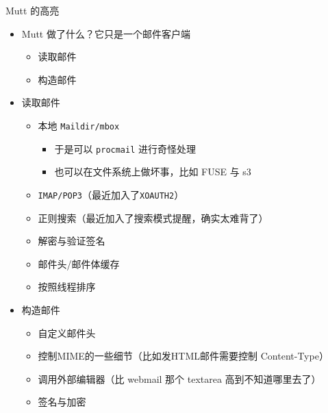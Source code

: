 \documentclass{ctexbeamer}
\newcommand{\T}[1]{\texttt{#1}}
\begin{document}
\begin{frame}{Mutt 的高亮}
  \begin{itemize}
    \item Mutt 做了什么？它只是一个邮件客户端\begin{itemize}
        \item 读取邮件
        \item 构造邮件
    \end{itemize}
    \item 读取邮件\begin{itemize}
        \item 本地 \T{Maildir/mbox}\begin{itemize}
          \item 于是可以 \T{procmail} 进行奇怪处理
          \item 也可以在文件系统上做坏事，比如 FUSE 与 s3
        \end{itemize}
        \item \T{IMAP/POP3}（最近加入了\T{XOAUTH2}）
        \item 正则搜索（最近加入了搜索模式提醒，确实太难背了）
        \item 解密与验证签名
        \item 邮件头/邮件体缓存
        \item 按照线程排序
    \end{itemize}
    \item 构造邮件\begin{itemize}
      \item 自定义邮件头
      \item 控制MIME的一些细节（比如发HTML邮件需要控制 Content-Type）
      \item 调用外部编辑器（比 webmail 那个 textarea 高到不知道哪里去了）
      \item 签名与加密
    \end{itemize}
  \end{itemize}
\end{frame}
\end{document}
